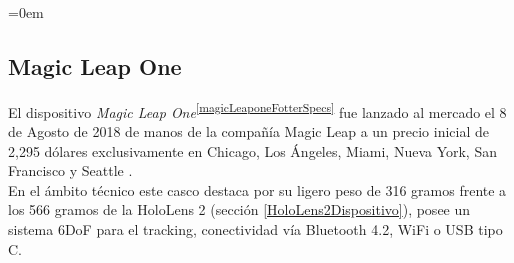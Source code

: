 \parindent=0em
\subsection{Magic Leap One}
\noindent

El dispositivo \textit{Magic Leap One}\textsuperscript{\ref{magicLeaponeFotterSpecs}} fue lanzado al mercado el 8 de Agosto de 2018 de manos de la compañía Magic Leap a un precio inicial de 2,295 dólares exclusivamente en Chicago, Los Ángeles, Miami, Nueva York, San Francisco y Seattle .\\

En el ámbito técnico este casco destaca por su ligero peso de 316 gramos frente a los 566 gramos de la HoloLens 2 (sección \ref{HoloLens2Dispositivo}), posee un sistema 6DoF para el tracking, conectividad vía Bluetooth 4.2, WiFi o USB tipo C.\\

